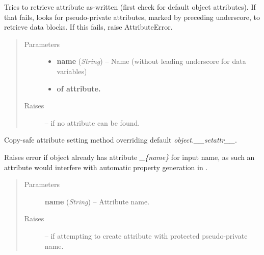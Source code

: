 \documentclass[letterpaper,10pt,english]{sphinxmanual}
\begin{document}
\begin{fulllineitems}
\begin{fulllineitems}
Tries to retrieve attribute as-written (first check for default object
attributes).  If that fails, looks for pseudo-private attributes, marked
by preceding underscore, to retrieve data blocks.  If this fails,
raise AttributeError.
\begin{quote}\begin{description}
\item[{Parameters}] \leavevmode\begin{itemize}
\item {} 
\textbf{name} (\emph{String}) --
Name (without leading underscore for data variables)

\item {} 
\textbf{of attribute.}

\end{itemize}

\item[{Raises}] \leavevmode
{} -- 
if no attribute can be found.

\end{description}\end{quote}

\end{fulllineitems}


\begin{fulllineitems}
\label{eqtools:eqtools.pfilereader.PFileReader.__setattr__}
Copy-safe attribute setting method overriding default
\emph{object.\_\_setattr\_\_}.

Raises error if object already has attribute \emph{\_\{name\}} for input name,
as such an attribute would interfere with automatic property generation
in {\hyperref[eqtools:eqtools.pfilereader.PFileReader.__getattribute__]{}}.
\begin{quote}\begin{description}
\item[{Parameters}] \leavevmode
\textbf{name} (\emph{String}) --
Attribute name.

\item[{Raises}] \leavevmode
{} -- 
if attempting to create attribute with protected
pseudo-private name.

\end{description}\end{quote}

\end{fulllineitems}


\end{fulllineitems}
\end{document}
